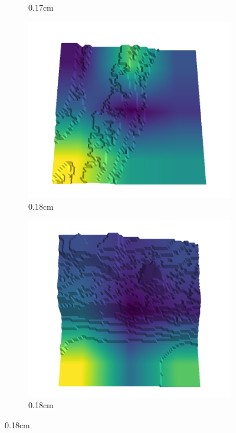 \begin{figure}[H]
\begin{subfigure}[b]{0.192\linewidth}
\caption{0.17cm}
\label{fig : quarry-false_negative-17}
\end{subfigure}
\begin{subfigure}[b]{0.192\linewidth}
\includegraphics[width=\linewidth]{../img/5/quarry/false_negative/17-patch-3d-majavi-colormap-180.png}
\caption{0.18cm}
\label{fig : quarry-false_negative-18}
\end{subfigure}
\begin{subfigure}[b]{0.192\linewidth}
\includegraphics[width=\linewidth]{../img/5/quarry/false_negative/18-patch-3d-majavi-colormap-190.png}
\caption{0.18cm}
\label{fig : quarry-false_negative-19}
\end{subfigure}
\label{fig : quarry-false_negative}
\end{figure}

